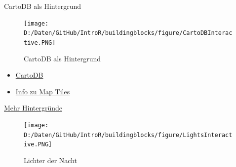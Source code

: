 \documentclass[ignorenonframetext,]{beamer}
\newenvironment{Shaded}{\begin{snugshade}}{\end{snugshade}}
\newcommand{\KeywordTok}[1]{\textcolor[rgb]{0.26,0.66,0.93}{\textbf{#1}}}
\newcommand{\StringTok}[1]{\textcolor[rgb]{0.02,0.61,0.04}{#1}}
\newcommand{\OperatorTok}[1]{\textcolor[rgb]{0.74,0.68,0.62}{#1}}
\newcommand{\NormalTok}[1]{\textcolor[rgb]{0.74,0.68,0.62}{#1}}
\begin{document}
\begin{frame}[fragile]{CartoDB als Hintergrund}

\begin{Shaded}
\end{Shaded}

\begin{figure}
\centering
\texttt{[image: D:/Daten/GitHub/IntroR/buildingblocks/figure/CartoDBInteractive.PNG]}
\caption{CartoDB als Hintergrund}
\end{figure}

\begin{itemize}
\item
  \href{https://carto.com/attribution}{CartoDB}
\item
  \href{https://www.mapbox.com/help/how-web-maps-work/}{Info zu Map
  Tiles}
\end{itemize}

\end{frame}

\begin{frame}[fragile]{\href{http://leaflet-extras.github.io/leaflet-providers/preview/index.html}{Mehr
Hintergründe}}

\begin{Shaded}
\end{Shaded}

\begin{figure}
\centering
\texttt{[image: D:/Daten/GitHub/IntroR/buildingblocks/figure/LightsInteractive.PNG]}
\caption{Lichter der Nacht}
\end{figure}

\end{frame}
\end{document}

